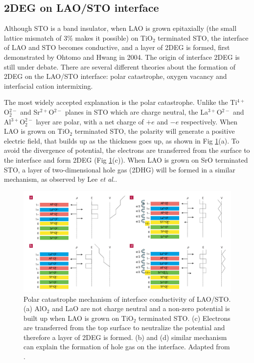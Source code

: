 \documentclass[pdflatex, sectionletters, 12pt, final, phd]{pittetd}    %
\begin{document}
\subsection{2DEG on LAO/STO interface}

Although STO is a band insulator, when LAO is grown epitaxially (the small lattice mismatch of 3\% makes it possible) on TiO$_2$ terminated STO, the interface of LAO and STO becomes conductive, and a layer of 2DEG is formed, first demonstrated by Ohtomo and Hwang in 2004\cite{ohtomo2004high}. The origin of interface 2DEG is still under debate. There are several different theories about the formation of 2DEG on the LAO/STO interface: polar catastrophe\cite{nakagawa2006some}, oxygen vacancy\cite{kalabukhov2007effect} and interfacial cation intermixing\cite{willmott2007structural}. 

The most widely accepted explanation is the polar catastrophe. Unlike the Ti$^{4+}$O$_2^{2-}$ and Sr$^{2+}$O$^{2-}$ planes in STO which are charge neutral, the La$^{3+}$O$^{2-}$ and Al$^{3+}$O$_2^{2-}$ layer are polar, with a net charge of $+e$ and $-e$ respectively. When LAO is grown on TiO$_2$ terminated STO, the polarity will generate a positive electric field, that builds up as the thickness goes up, as shown in Fig \ref{FIG:PolarCatastrophe}(a). To avoid the divergence of potential, the electrons are transferred from the surface to the interface and form 2DEG (Fig \ref{FIG:PolarCatastrophe}(c)). When LAO is grown on SrO terminated STO, a layer of two-dimensional hole gas (2DHG) will be formed in a similar mechanism, as observed by Lee \textit{et al.}\cite{lee2018direct}.

\begin{figure}[h!]
	\centering
	\includegraphics[width=1.0\textwidth]{Drawing/PolarCatastrophe.pdf}
	\caption[Polar catastrophe mechanism of interface conductivity of LAO/STO]{Polar catastrophe mechanism of interface conductivity of LAO/STO. (a) AlO$_2$ and LaO are not charge neutral and a non-zero potential is built up when LAO is grown on TiO$_2$ terminated STO. (c) Electrons are transferred from the top surface to neutralize the potential and therefore a layer of 2DEG is formed. (b) and (d) similar mechanism can explain the formation of hole gas on the interface. Adapted from \cite{nakagawa2006some}.}
	\label{FIG:PolarCatastrophe}
\end{figure}
\end{document}
